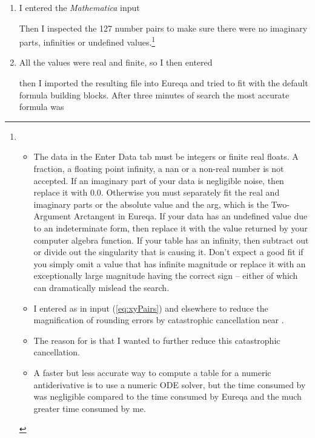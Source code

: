 \documentclass[12pt,english]{article}
\begin{document}
\begin{enumerate}
\item I entered the \textsl{Mathematica} input\vspace{-5pt}

Then I inspected the 127 number pairs to make sure there were no imaginary
parts, infinities or undefined values.\footnote{\begin{itemize}
\item The data in the \textsf{Enter Data} tab must be integers or finite
real floats. A fraction, a floating point infinity, a nan or a non-real
number is not accepted. If an imaginary part of your data is negligible
noise, then replace it with 0.0. Otherwise you must separately fit
the real and imaginary parts or the absolute value and the arg, which
is the \textsf{Two-Argument Arctangent} in Eureqa. If your data has
an undefined value due to an indeterminate form, then replace it with
the value returned by your computer algebra 
function. If your table has an infinity, then subtract out or divide
out the singularity that is causing it. Don't expect a good fit if
you simply omit a value that has infinite magnitude or replace it
with an exceptionally large magnitude having the correct sign -- either
of which can dramatically mislead the search.\vspace{-3pt}

\item I entered  as  in input (\ref{eq:xyPairs})
and elsewhere to reduce the magnification of rounding errors by catastrophic
cancellation near .\vspace{-3pt}

\item The reason for  is that I
wanted to further reduce this catastrophic cancellation.\vspace{-3pt}

\item A faster but less accurate way to compute a table for a numeric antiderivative
is to use a numeric ODE solver, but the time consumed by 
was negligible compared to the time consumed by Eureqa and the much
greater time consumed by me.
\end{itemize}
}
\item All the values were real and finite, so I then entered\vspace{-5pt}

then I imported the resulting file into Eureqa and tried to fit 
with the default formula building blocks. After three minutes of search
the most accurate formula was\vspace{-5pt}


\end{enumerate}
\end{document}
